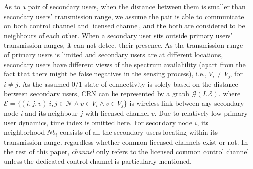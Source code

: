 \documentclass[10pt,journal,compsoc]{IEEEtran}
\theoremstyle{mytheoremstyle}
\theoremstyle{mytheoremstyle}
\theoremstyle{mytheoremstyle}
\newcommand{\ie}{i.e., }
\begin{document}
As to a pair of secondary users, when the distance between them is smaller than secondary users' transmission range, we assume the pair is able to communicate on both control channel and licensed channel, and the both are considered to be neighbours of each other.
When a secondary user sits outside primary users' transmission ranges, it can not detect their presence.
As the transmission range of primary users is limited and secondary users are at different locations, secondary users have different views of the spectrum availability (apart from the fact that there might be false negatives in the sensing process), i.e., $V_i \neq V_j$, for $i \neq j$.	
%
As the assumed $0/1$ state of connectivity is solely based on the distance between secondary users, CRN can be represented by a graph $\mathcal{G}(I,\mathcal{E})$, where $\mathcal{E}=\lbrace(i,j,v) \vert i, j \in \mathcal{N} \wedge v\in V_i \wedge v\in V_j \rbrace$ is wireless link between any secondary node $i$ and its neighbour $j$ with licensed channel $v$.
Due to relatively low primary user dynamics, time index is omitted here.
For secondary node $i$, its neighborhood $Nb_i$ consists of all the secondary users locating within its transmission range, regardless whether common licensed channels exist or not. 
In the rest of this paper, \textit{channel} only refers to the licensed common control channel unless the dedicated control channel is particularly mentioned.
\end{document}
